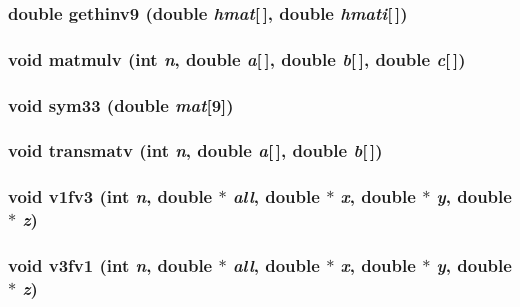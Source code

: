 \subsubsection{\setlength{\rightskip}{0pt plus 5cm}double gethinv9 (double {\em hmat}[$\,$], double {\em hmati}[$\,$])}\label{md__mathlib_8c_3371cf5cbee70fc2645ecee13615a7bd}


\subsubsection{\setlength{\rightskip}{0pt plus 5cm}void matmulv (int {\em n}, double {\em a}[$\,$], double {\em b}[$\,$], double {\em c}[$\,$])}\label{md__mathlib_8c_ef8cb8452c04c696d2a489a26fc4de59}


\subsubsection{\setlength{\rightskip}{0pt plus 5cm}void sym33 (double {\em mat}[9])}\label{md__mathlib_8c_6088469b1fad01690a4e149702e2587e}


\subsubsection{\setlength{\rightskip}{0pt plus 5cm}void transmatv (int {\em n}, double {\em a}[$\,$], double {\em b}[$\,$])}\label{md__mathlib_8c_8d6bd180f89f104802e830b8973e5783}


\subsubsection{\setlength{\rightskip}{0pt plus 5cm}void v1fv3 (int {\em n}, double $\ast$ {\em all}, double $\ast$ {\em x}, double $\ast$ {\em y}, double $\ast$ {\em z})}\label{md__mathlib_8c_19b1fc64b2d6b50b14e949a0f9c7a709}


\subsubsection{\setlength{\rightskip}{0pt plus 5cm}void v3fv1 (int {\em n}, double $\ast$ {\em all}, double $\ast$ {\em x}, double $\ast$ {\em y}, double $\ast$ {\em z})}\label{md__mathlib_8c_2639a3e2250a8b5d89e13afc5928e566}


